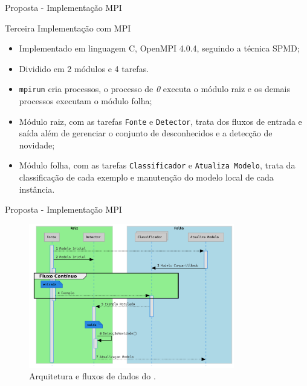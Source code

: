 \documentclass[aspectratio=1610,10pt]{beamer}
\newcommand{\fonte}[1]{\vspace{-1em}{\footnotesize\textbf{Fonte:} #1}}
\begin{document}
\begin{frame}[fragile]{Proposta - Implementação MPI}
\begin{alertblock}{Terceira Implementação com MPI}
  \begin{itemize}
    \item Implementado em linguagem C, OpenMPI 4.0.4, seguindo a técnica SPMD;
    \item Dividido em 2 módulos e 4 tarefas.
    \item \texttt{mpirun} cria processos, o processo de \emph{0} executa o
    módulo raiz e os demais processos executam o módulo folha;
    \item Módulo raiz, com as tarefas \texttt{Fonte} e \texttt{Detector}, trata
    dos fluxos de entrada e saída além de gerenciar o conjunto de desconhecidos
    e a detecção de novidade;
    \item Módulo folha, com as tarefas \texttt{Classificador} e \texttt{Atualiza Modelo},
    trata da classificação de cada exemplo e manutenção do modelo local de cada instância.
  \end{itemize}
\end{alertblock}
\end{frame}

\begin{frame}[fragile]{Proposta - Implementação MPI}
  \begin{figure}[h]
    \centering
    \vspace{-0.5em}
    \includegraphics[width=0.8\textwidth,page=1]{figures/lifecycle-uml-svg.pdf}
    \vspace{-0.5em}
    \caption{Arquitetura e fluxos de dados do \mfog.}
    \vspace{-0.5em}
    \fonte{O autor.}
    \label{fig:arch}
  \end{figure}
\end{frame}
\end{document}
